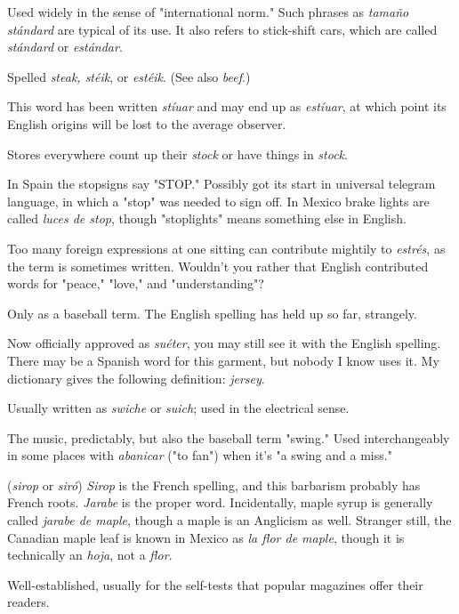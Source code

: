  Used widely in the sense of "international
norm." Such phrases as \emph{tamaño stándard} are typical of its use. It
also refers to stick-shift cars, which are called \emph{stándard} or \emph{estándar}.

 Spelled \emph{steak, stéik}, or \emph{estéik}. (See also \emph{beef}.)

 This word has been written \emph{stíuar} and may end up
as \emph{estíuar}, at which point its English origins will be lost to the average
observer.

 Stores everywhere count up their \emph{stock} or have
things in \emph{stock}.

 In Spain the stopsigns say "STOP." Possibly got its
start in universal telegram language, in which a "stop" was needed to
sign off. In Mexico brake lights are called \emph{luces de stop}, though "stoplights" means something else in English.

 Too many foreign expressions at one sitting can
contribute mightily to \emph{estrés}, as the term is sometimes written.
Wouldn't you rather that English contributed words for "peace,"
"love," and "understanding"?

 Only as a baseball term. The English spelling has
held up so far, strangely.

 Now officially approved as \emph{suéter}, you may still
see it with the English spelling. There may be a Spanish word for this
garment, but nobody I know uses it. My dictionary gives the following
definition: \emph{jersey}.

 Usually written as \emph{swiche} or \emph{suich}; used in the electrical sense.

 The music, predictably, but also the baseball term
"swing." Used interchangeably in some places with \emph{abanicar} ("to fan")
when it's "a swing and a miss."

 (\emph{sirop} or \emph{siró}) \emph{Sirop} is the French spelling, and this
barbarism probably has French roots. \emph{Jarabe} is the proper word. Incidentally, maple syrup is generally called \emph{jarabe de maple}, though a
maple is an Anglicism as well. Stranger still, the Canadian maple leaf
is known in Mexico as \emph{la flor de maple}, though it is technically an
\emph{hoja}, not a \emph{flor}.

 Well-established, usually for the self-tests that popular
magazines offer their readers.

